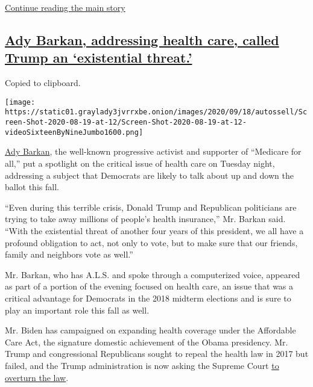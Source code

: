 \protect\hyperlink{after-dfp-ad-mid2}{Continue reading the main story}

\hypertarget{ady-barkan-addressing-health-care-called-trump-an-existential-threat}{%
\subsection{\texorpdfstring{\protect\hyperlink{ady-barkan-addressing-health-care-called-trump-an-existential-threat}{Ady
Barkan, addressing health care, called Trump an `existential
threat.'}}{Ady Barkan, addressing health care, called Trump an `existential threat.'}}\label{ady-barkan-addressing-health-care-called-trump-an-existential-threat}}

Copied to clipboard.

\texttt{[image: https://static01.graylady3jvrrxbe.onion/images/2020/09/18/autossell/Screen-Shot-2020-08-19-at-12/Screen-Shot-2020-08-19-at-12-videoSixteenByNineJumbo1600.png]}

\href{https://www.nytimes3xbfgragh.onion/2020/08/18/us/politics/ady-barkan-biden-democrats.html}{Ady
Barkan}, the well-known progressive activist and supporter of ``Medicare
for all,'' put a spotlight on the critical issue of health care on
Tuesday night, addressing a subject that Democrats are likely to talk
about up and down the ballot this fall.

``Even during this terrible crisis, Donald Trump and Republican
politicians are trying to take away millions of people's health
insurance,'' Mr. Barkan said. ``With the existential threat of another
four years of this president, we all have a profound obligation to act,
not only to vote, but to make sure that our friends, family and
neighbors vote as well.''

Mr. Barkan, who has A.L.S. and spoke through a computerized voice,
appeared as part of a portion of the evening focused on health care, an
issue that was a critical advantage for Democrats in the 2018 midterm
elections and is sure to play an important role this fall as well.

Mr. Biden has campaigned on expanding health coverage under the
Affordable Care Act, the signature domestic achievement of the Obama
presidency. Mr. Trump and congressional Republicans sought to repeal the
health law in 2017 but failed, and the Trump administration is now
asking the Supreme Court
\href{https://www.nytimes3xbfgragh.onion/2020/06/26/us/politics/obamacare-trump-administration-supreme-court.html}{to
overturn the law}.

